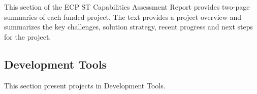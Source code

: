 \documentclass{ecpreport-publicv1}
\newcommand{\pmr}{Programming Models \& Runtimes}
\newcommand{\tools}{Development Tools}
\begin{document}
This section of the ECP ST Capabilities Assessment Report provides two-page summaries of each funded project.  The text provides a project overview and summarizes the key challenges, solution strategy, recent progress and next steps for the project.
\newpage
%
%
%
%
%
%
%
%
%
%


\subsection{\tools}
This section present projects in \tools.
\newpage

\newpage

\newpage

\newpage







\newpage



\newpage

\newpage
\end{document}
